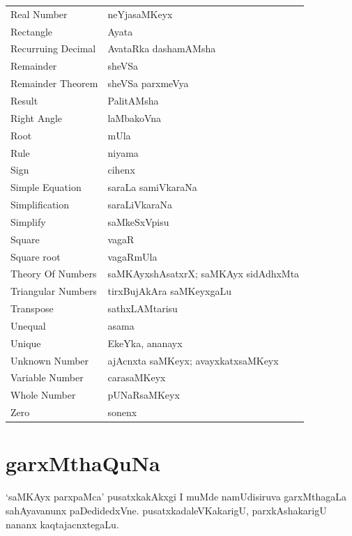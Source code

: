 \begin{longtable}{>{\rm}l@{\hspace{2cm}}l}
Real Number & neYjasaMKeyx\\
Rectangle & Ayata\\
Recurruing Decimal & AvataRka dashamAMsha\\
Remainder & sheVSa\\
Remainder Theorem & sheVSa parxmeVya\\
Result & PalitAMsha\\
Right Angle & laMbakoVna\\
Root & mUla\\
Rule & niyama\\
Sign & cihenx\\
Simple Equation & saraLa samiVkaraNa\\
Simplification & saraLiVkaraNa\\
Simplify & saMkeSxVpisu\\
Square & vagaR\\
Square root & vagaRmUla\\
Theory Of Numbers & saMKAyxshAsatxrX; saMKAyx sidAdhxMta\\
Triangular Numbers & tirxBujAkAra saMKeyxgaLu\\
Transpose & sathxLAMtarisu\\
Unequal & asama\\
Unique & EkeYka, ananayx\\
Unknown Number & ajAcnxta saMKeyx; avayxkatxsaMKeyx\\
Variable Number & carasaMKeyx\\
Whole Number & pUNaRsaMKeyx\\
Zero & sonenx
\end{longtable}

\eject
\section*{\hspace{4.5cm}garxMthaQuNa}

`saMKAyx parxpaMca' pusatxkakAkxgi I muMde namUdisiruva garxMthagaLa sahAyavanunx paDedidedxVne. pusatxkadaleVKakarigU, parxkAshakarigU nananx kaqtajacnxtegaLu.

